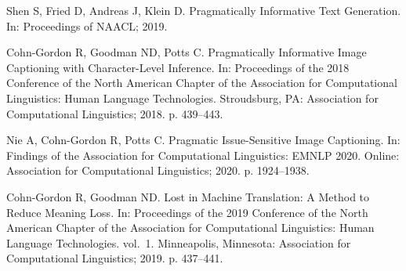 \documentclass[10pt,letterpaper]{article}
\begin{document}
\begin{thebibliography}{10}
Shen S, Fried D, Andreas J, Klein D.
\newblock Pragmatically Informative Text Generation.
\newblock In: Proceedings of NAACL; 2019.

Cohn-Gordon R, Goodman ND, Potts C.
\newblock Pragmatically Informative Image Captioning with Character-Level
  Inference.
\newblock In: Proceedings of the 2018 Conference of the {N}orth {A}merican
  Chapter of the {A}ssociation for {C}omputational {L}inguistics: Human
  Language Technologies. Stroudsburg, PA: Association for Computational
  Linguistics; 2018. p. 439--443.

Nie A, Cohn-Gordon R, Potts C.
\newblock Pragmatic Issue-Sensitive Image Captioning.
\newblock In: Findings of the Association for Computational Linguistics: EMNLP
  2020. Online: Association for Computational Linguistics; 2020. p. 1924--1938.

Cohn-Gordon R, Goodman ND.
\newblock Lost in Machine Translation: A Method to Reduce Meaning Loss.
\newblock In: Proceedings of the 2019 Conference of the North American Chapter
  of the Association for Computational Linguistics: {H}uman Language
  Technologies. vol.~1. Minneapolis, Minnesota: Association for Computational
  Linguistics; 2019. p. 437--441.
  
\end{thebibliography}
\end{document}
